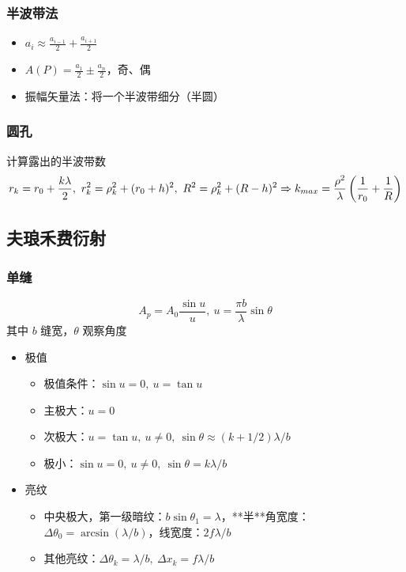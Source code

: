 \documentclass{article}
\begin{document}
\subsubsection{半波带法}

\begin{itemize}
    \item $a_i\approx\frac{a_{i-1}}{2}+\frac{a_{i+1}}{2}$
    \item $A(P)=\frac{a_1}{2}\pm\frac{a_n}{2}$，奇、偶
    \item 振幅矢量法：将一个半波带细分（半圆）
\end{itemize}

\subsubsection{圆孔}

计算露出的半波带数 $$
r_k=r_0+\frac{k\lambda}{2},\ r_k^2=\rho_k^2+(r_0+h)^2,\ R^2=\rho_k^2+(R-h)^2\\\Rightarrow k_{max}=\frac{\rho^2}{\lambda}\left(\frac{1}{r_0}+\frac{1}{R}\right)
$$

\subsection{夫琅禾费衍射}

\subsubsection{单缝}

$$
A_p=A_0\frac{\sin u}{u},\ u=\frac{\pi b}{\lambda}\sin\theta
$$
其中 $b$ 缝宽，$\theta$ 观察角度
\begin{itemize}
    \item 极值 \begin{itemize}
        \item 极值条件：$\sin u=0,\ u=\tan u$
        \item 主极大：$u=0$
        \item 次极大：$u=\tan u,\ u\neq 0,\ \sin\theta\approx(k+1/2)\lambda/b$
        \item 极小：$\sin u=0,\ u\neq 0,\ \sin\theta=k\lambda/b$
    \end{itemize}
    \item 亮纹 \begin{itemize}
        \item 中央极大，第一级暗纹：$b\sin\theta_1=\lambda$，**半**角宽度：$\Delta\theta_0=\arcsin(\lambda/b)$，线宽度：$2f\lambda/b$
        \item 其他亮纹：$\Delta\theta_k=\lambda/b,\ \Delta x_k=f\lambda/b$
    \end{itemize}
\end{itemize}
\end{document}
